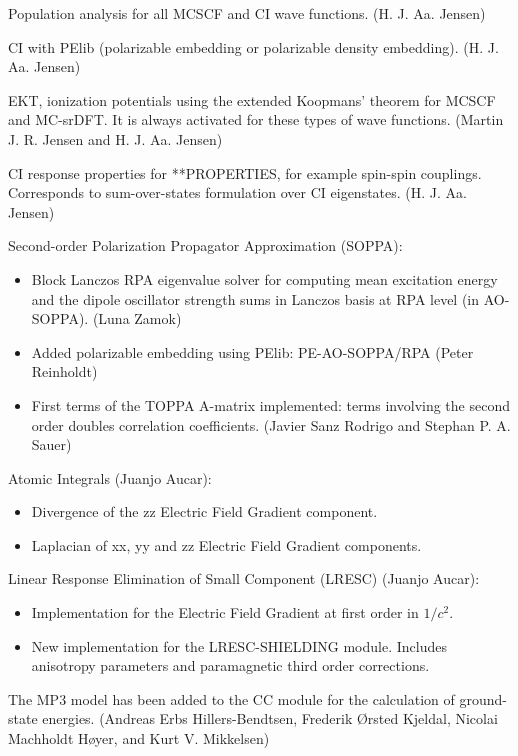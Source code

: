 \begin{description}

 \item Population analysis for all MCSCF and CI wave functions. (H. J. Aa. Jensen)
 \item CI with PElib (polarizable embedding or polarizable density embedding). (H. J. Aa. Jensen)
 \item EKT, ionization potentials using the extended Koopmans' theorem for MCSCF and MC-srDFT. It is always activated for these types of wave functions. (Martin J. R. Jensen and H. J. Aa. Jensen)
 \item CI response properties for **PROPERTIES, for example spin-spin couplings. Corresponds to sum-over-states formulation over CI eigenstates. (H. J. Aa. Jensen)
 \item Second-order Polarization Propagator Approximation (SOPPA):
  \begin{itemize}
   \item Block Lanczos RPA eigenvalue solver for computing mean excitation energy and the dipole oscillator strength sums in Lanczos basis at RPA level (in AO-SOPPA). (Luna Zamok)
   \item Added polarizable embedding using PElib: PE-AO-SOPPA/RPA (Peter Reinholdt)
   \item First terms of the TOPPA A-matrix implemented: terms involving the second order doubles correlation coefficients. (Javier Sanz Rodrigo and Stephan P. A. Sauer)
  \end{itemize}
 \item Atomic Integrals (Juanjo Aucar):
  \begin{itemize}
   \item Divergence of the zz Electric Field Gradient component.
   \item Laplacian of xx, yy and zz Electric Field Gradient components.
  \end{itemize}
 \item Linear Response Elimination of Small Component (LRESC) (Juanjo Aucar):
  \begin{itemize}
   \item Implementation for the Electric Field Gradient at first order in $1/c^2$.
   \item New implementation for the LRESC-SHIELDING module. Includes anisotropy parameters and paramagnetic third order corrections.
  \end{itemize}
 \item The MP3 model has been added to the CC module for the calculation of ground-state energies. (Andreas Erbs Hillers-Bendtsen, Frederik Ørsted Kjeldal, Nicolai Machholdt Høyer, and Kurt V. Mikkelsen)

\end{description}
